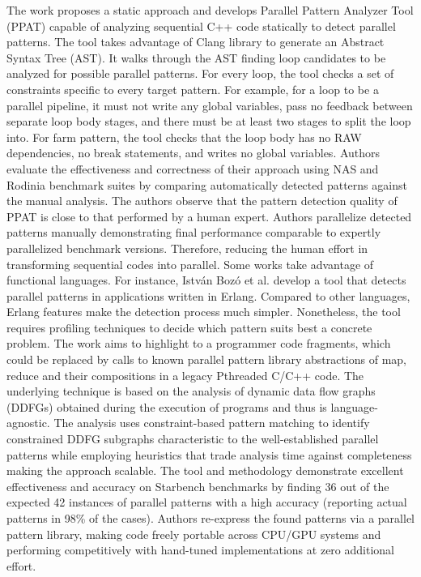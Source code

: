 \quad The work \cite{skeletons-static} proposes a static approach and develops Parallel Pattern Analyzer Tool (PPAT) capable of analyzing sequential C++ code statically to detect parallel patterns. The tool takes advantage of Clang library to generate an Abstract Syntax Tree (AST). It walks through the AST finding loop candidates to be analyzed for possible parallel patterns. For every loop, the tool checks a set of constraints specific to every target pattern. For example, for a loop to be a parallel pipeline, it must not write any global variables, pass no feedback between separate loop body stages, and there must be at least two stages to split the loop into. For farm pattern, the tool checks that the loop body has no RAW dependencies, no break statements, and writes no global variables. Authors evaluate the effectiveness and correctness of their approach using NAS \cite{nasa-parallel-benchmarks} and Rodinia benchmark suites by comparing automatically detected patterns against the manual analysis. The authors observe that the pattern detection quality of PPAT is close to that performed by a human expert. Authors parallelize detected patterns manually demonstrating final performance comparable to expertly parallelized benchmark versions. Therefore, reducing the human effort in transforming sequential codes into parallel.\newline\null
\quad Some works take advantage of functional languages. For instance, István Bozó et al. \cite{10.1145/2633448.2633453} develop a tool that detects parallel patterns in applications written in Erlang. Compared to other languages, Erlang
features make the detection process much simpler. Nonetheless, the tool requires profiling techniques to decide which pattern suits best a concrete problem.\newline\null
\quad The work \cite{roberto-lozano-skeletons} aims to highlight to a programmer code fragments, which could be replaced by calls to known parallel pattern library abstractions of map, reduce and their compositions in a legacy Pthreaded C/C++ code. The underlying technique is based on the analysis of dynamic data flow graphs (DDFGs) obtained during the execution of programs and thus is language-agnostic. The analysis uses constraint-based pattern matching to identify constrained DDFG subgraphs characteristic to the well-established parallel patterns while employing heuristics that trade analysis time against completeness making the approach scalable. The tool and methodology demonstrate excellent effectiveness and accuracy on Starbench benchmarks by finding 36 out of the expected 42 instances of parallel patterns with a high accuracy (reporting actual patterns in 98\% of the cases). Authors re-express the found patterns via a parallel pattern library, making code freely portable across CPU/GPU systems and performing competitively with hand-tuned implementations at zero additional effort.\newline\null
